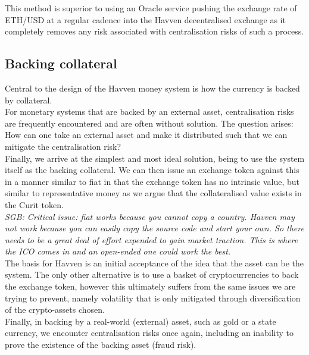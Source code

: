 \documentclass{article}
\begin{document}
\noindent This method is superior to using an Oracle service pushing the exchange rate of ETH/USD at a regular cadence into the Havven decentralised exchange as it completely removes any risk associated with centralisation risks of such a process. \\

\subsection{Backing collateral}

Central to the design of the Havven money system is how the currency is backed by collateral. \\

\noindent For monetary systems that are backed by an external asset, centralisation risks are frequently encountered and are often without solution. The question arises: \\

\noindent How can one take an external asset and make it distributed such that we can mitigate the centralisation risk? \\

\noindent Finally, we arrive at the simplest and most ideal solution, being to use the system itself as the backing collateral. We can then issue an exchange token against this in a manner similar to fiat in that the exchange token has no intrinsic value, but similar to representative money as we argue that the collateralised value exists in the Curit token. \\

\noindent \textit{SGB: Critical issue: fiat works because you cannot copy a country. Havven may not work because you can easily copy the source code and start your own. So there needs to be a great deal of effort expended to gain market traction. This is where the ICO comes in and an open-ended one could work the best.} \\

\noindent The basis for Havven is an initial acceptance of the idea that the asset can be the system. The only other alternative is to use a basket of cryptocurrencies to back the exchange token, however this ultimately suffers from the same issues we are trying to prevent, namely volatility that is only mitigated through diversification of the crypto-assets chosen. \\

\noindent Finally, in backing by a real-world (external) asset, such as gold or a state currency, we encounter centralisation risks once again, including an inability to prove the existence of the backing asset (fraud risk). \\
\end{document}
